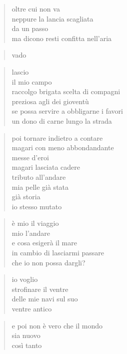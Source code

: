 	\begin{verse}
		oltre cui non va\\
		neppure la lancia scagliata\\
		da un passo\\
		ma dicono resti confitta nell’aria
	\end{verse}

	\begin{verse}
		vado
	\end{verse}

	\begin{verse}
		lascio\\
		il mio campo\\
		raccolgo brigata scelta di compagni\\
		preziosa agli dei gioventù\\
		se possa servire a obbligarne i favori\\
		un dono di carne lungo la strada
	\end{verse}

	\begin{verse}
		poi tornare indietro a contare\\
		magari con meno abbondandante\\
		messe d’eroi\\
		magari lasciata cadere\\
		tributo all’andare\\
		mia pelle già stata\\
		già storia\\
		io stesso mutato
	\end{verse}

	\begin{verse}
		è mio il viaggio\\
		mio l’andare\\
		e cosa esigerà il mare\\
		in cambio di lasciarmi passare\\
		che io non possa dargli?
	\end{verse}

	\begin{verse}
		io voglio\\
		strofinare il ventre\\
		delle mie navi sul suo\\
		ventre antico
	\end{verse}

	\begin{verse}
		e poi non è vero che il mondo\\
		sia nuovo\\
		così tanto
	\end{verse}


